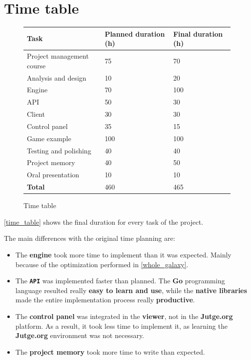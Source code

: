 \documentclass[a4paper,11pt,titlepage,abstract,numbers=noenddot,automark,mnsy,intlimits,rgb,dvipsnames]{report}
\begin{document}
\section{Time table}
\begin{figure}[H]
\begin{center}
\begin{tabular}{l | l | l}
\textbf{Task} & \textbf{Planned duration (h)} & \textbf{Final duration (h)}\\
\hline
Project management course & 75 & 70\\
Analysis and design & 10 & 20\\
Engine & 70 & 100\\
API & 50 & 30\\
Client & 30 & 30\\
Control panel & 35 & 15\\
Game example & 100 & 100\\
Testing and polishing & 40 & 40\\
Project memory & 40 & 50\\
Oral presentation & 10 & 10\\
\hline
\hline
\textbf{Total} & 460 & 465\\
\end{tabular}
\end{center}
\caption{Time table}
\label{time_table}
\end{figure}
\autoref{time_table} shows the final duration for every task of the project.

The main differences with the original time planning are:
\begin{itemize}
\item
The \textbf{engine} took more time to implement than it was expected. Mainly because of the optimization
  performed in \autoref{whole_galaxy}.
\item
The \textbf{\texttt{API}} was implemented faster than planned. The \textbf{Go} programming language resulted really \textbf{easy to
  learn and use}, while the \textbf{native libraries} made the entire implementation process really \textbf{productive}.
\item
The \textbf{control panel} was integrated in the \textbf{viewer}, not in the \textbf{Jutge.org} platform. As a result,
  it took less time to implement it, as learning the \textbf{Jutge.org} environment was not necessary.
\item
The \textbf{project memory} took more time to write than expected.
\end{itemize}
\end{document}
